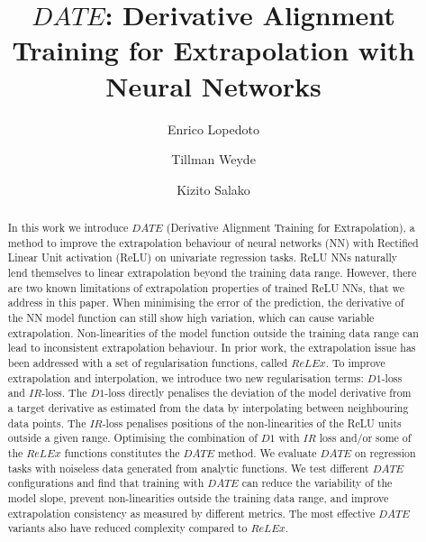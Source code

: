 \documentclass[runningheads]{llncs}
\begin{document}
\title{$DATE$: Derivative Alignment Training for Extrapolation with Neural Networks}

\author{Enrico Lopedoto 
\and Tillman Weyde\and Kizito Salako}



\maketitle 
\begin{abstract}

In this work we introduce $DATE$ (Derivative Alignment Training for Extrapolation), a method to improve the extrapolation behaviour of neural networks (NN) with Rectified Linear Unit activation (ReLU) on univariate regression tasks. 
ReLU NNs naturally lend themselves to linear extrapolation beyond the training data range. 
However, there are two known limitations of extrapolation properties of trained ReLU NNs, that we address in this paper. 
When minimising the error of the prediction, the derivative of the NN model function can still show high variation, which can cause variable extrapolation. 
Non-linearities of the model function outside the training data range can lead to inconsistent extrapolation behaviour.
In prior work, the extrapolation issue has been addressed with a set of regularisation functions, called $ReLEx$. 
To improve extrapolation and interpolation, we introduce two new regularisation terms: $D1$-loss and $IR$-loss. 
The $D1$-loss directly penalises the deviation of the model derivative from a target derivative as estimated from the data by interpolating between neighbouring data points. 
The $IR$-loss penalises positions of the non-linearities of the ReLU units outside a given range. Optimising the combination of $D1$ with $IR$ loss and/or some of the $ReLEx$ functions constitutes the $DATE$ method.
We evaluate $DATE$ on regression tasks with noiseless data generated from analytic functions. 
We test different $DATE$ configurations and find that training with $DATE$ can reduce the variability of the model slope, prevent non-linearities outside the training data range, and improve extrapolation consistency as measured by different metrics. 
The most effective $DATE$ variants also have reduced complexity compared to $ReLEx$.


\end{abstract}
\end{document}
